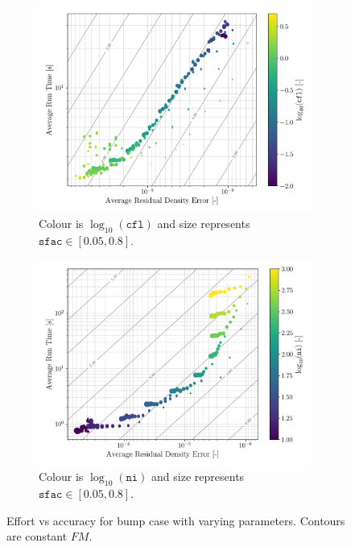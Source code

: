 \documentclass{article}
\begin{document}
\begin{figure}[H]
    \begin{subfigure}{0.49\textwidth}
        \centering
        \includegraphics[width=0.99\textwidth]{figures/effort_vs_accuracy_cfl.png}
        \caption{Colour is $\log_{10}( \texttt{cfl})$ and size represents \\ $\texttt{sfac} \in [0.05, 0.8]$.}
        \label{fig:effort_vs_accuracy_cfl}
    \end{subfigure}
    \begin{subfigure}{0.49\textwidth}
        \centering
        \includegraphics[width=0.99\textwidth]{figures/effort_vs_accuracy_ni.png}
        \caption{Colour is $\log_{10}( \texttt{ni})$ and size represents \\ $\texttt{sfac} \in [0.05, 0.8]$.}
        \label{fig:effort_vs_accuracy_ni}
    \end{subfigure}
    \caption{Effort vs accuracy for bump case with varying parameters. Contours are constant $FM$.}
    \label{fig:effort_vs_accuracy_1}
\end{figure}
\end{document}
